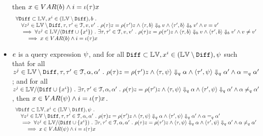 \begin{lem}
\begin{itemize}
	then 
	 $x \in VAR(b) \land i = \iota(\mathtt{\tau}) x$
	\[
		\begin{array}{l}
		\forall \mathtt{Diff} \subset \mathbb{LV},  x^i \in (\mathbb{LV} \setminus \mathtt{Diff}), b ~.~
		\\ \quad
		\forall z^j \in \mathbb{LV} \setminus \mathtt{Diff}, \mathtt{\tau}, \mathtt{\tau}' \in \mathcal{T}, v, v' ~.~ 
		\rho(\mathtt{\tau}) z = \rho(\mathtt{\tau}') z \land 
		\langle \mathtt{\tau}, b \rangle \Downarrow_b v \land \langle \mathtt{\tau}', b \rangle \Downarrow_b v' \land v = v'
		\\ \quad
		\implies 
		\forall z^j \in \mathbb{LV} / (\mathtt{Diff} \cup \{x^i\} ) ~.~ 
		 \exists \mathtt{\tau}, \mathtt{\tau}' \in \mathcal{T}, v, v'~.~ 
		\rho(\mathtt{\tau}) z = \rho(\mathtt{\tau}') z \land 
		\langle \mathtt{\tau}, b \rangle \Downarrow_b v \land \langle \mathtt{\tau}', b \rangle \Downarrow_b v' \land v \neq v'
		\\ \qquad
		\implies x \in VAR(b) \land i = \iota(\mathtt{\tau}) x
		\end{array}
	\]
% 
	\item $e$ is a query expression $\psi$,
	and for all $\mathtt{Diff} \subset \mathbb{LV},  x^i \in (\mathbb{LV} \setminus \mathtt{Diff}), \psi$ such that 
	for all $ z^j \in \mathbb{LV} \setminus \mathtt{Diff}, \mathtt{\tau}, \mathtt{\tau}' \in \mathcal{T}, \alpha, \alpha' ~.~ 
 \rho(\mathtt{\tau}) z = \rho(\mathtt{\tau}') z \land 
 \langle \mathtt{\tau}, \psi \rangle \Downarrow_q \alpha \land \langle \mathtt{\tau}', \psi \rangle \Downarrow_q \alpha' \land \alpha =_q \alpha'$;
 and for all 
	$ z^j \in \mathbb{LV} / (\mathtt{Diff} \cup \{x^i\} ) ~.~ 
  \exists \mathtt{\tau}, \mathtt{\tau}' \in \mathcal{T}, \alpha, \alpha'~.~ 
 \rho(\mathtt{\tau}) z = \rho(\mathtt{\tau}') z \land 
 \langle \mathtt{\tau}, \psi \rangle \Downarrow_q \alpha \land \langle \mathtt{\tau}', \psi \rangle \Downarrow_q \alpha' \land \alpha \neq_{q} \alpha'$,
 then  $x \in VAR(\psi) \land i = \iota(\mathtt{\tau}) x$.
	\[
		\begin{array}{l}
		\forall \mathtt{Diff} \subset \mathbb{LV},  x^i \in (\mathbb{LV} \setminus \mathtt{Diff}), \psi ~.~
		\\ \quad
		\forall z^j \in \mathbb{LV} \setminus \mathtt{Diff}, \mathtt{\tau}, \mathtt{\tau}' \in \mathcal{T}, \alpha, \alpha' ~.~ 
		\rho(\mathtt{\tau}) z = \rho(\mathtt{\tau}') z \land 
		\langle \mathtt{\tau}, \psi \rangle \Downarrow_q \alpha \land \langle \mathtt{\tau}', \psi \rangle \Downarrow_q \alpha' \land \alpha =_q \alpha'
		\\ \quad
		\implies 
		\forall z^j \in \mathbb{LV} / (\mathtt{Diff} \cup \{x^i\} ) ~.~ 
		 \exists \mathtt{\tau}, \mathtt{\tau}' \in \mathcal{T}, \alpha, \alpha'~.~ 
		\rho(\mathtt{\tau}) z = \rho(\mathtt{\tau}') z \land 
		\langle \mathtt{\tau}, \psi \rangle \Downarrow_q \alpha \land \langle \mathtt{\tau}', \psi \rangle \Downarrow_q \alpha' \land \alpha \neq_{q} \alpha'
		\\ \qquad
		\implies x \in VAR(\psi) \land i = \iota(\mathtt{\tau}) x
		\end{array}
	\]
	\end{itemize}
	\end{lem}
